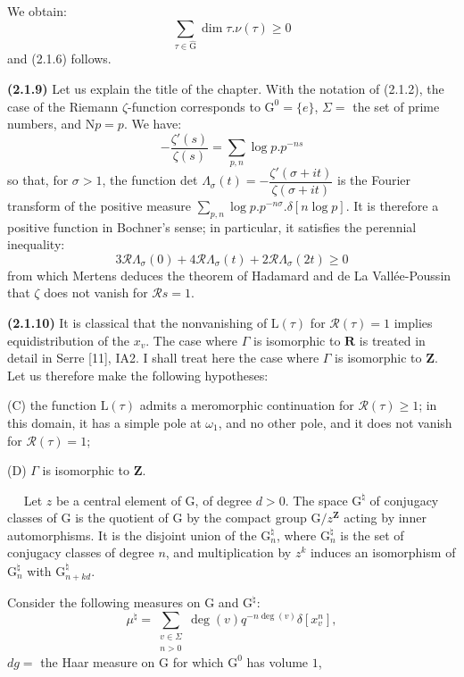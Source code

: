 \documentclass[11pt,leqno]{article}
\newcommand{\Page}[1]{\ifvmode\noindent\else\unskip\ \fi{\footnotesize\textcolor{gray}{[p.\,#1]}}\ \ignorespaces}
\begin{document}
We obtain:
\[
\sum_{\tau\in\widehat{\mathrm{G}}}\dim\tau.\nu(\tau)\geq0
\]
and (2.1.6) follows.

\textbf{(2.1.9)} Let us explain the title of the chapter. With the notation of (2.1.2), the case of the Riemann \(\zeta\)-function corresponds to \(\mathrm{G}^0=\{e\}\), \(\Sigma=\) the set of prime numbers, and \(\mathrm{N}p=p\). We have:
\[
-\frac{\zeta'(s)}{\zeta(s)}
 =\sum_{p,n}\log p.p^{-ns}
\]
so that, for \(\sigma>1\), the function det \(\Lambda_\sigma(t)=-\dfrac{\zeta'(\sigma+it)}{\zeta(\sigma+it)}\) is the Fourier transform of the positive measure \(\displaystyle\sum_{p,n}\log p.p^{-n\sigma}.\delta[n\log p]\). It is therefore a positive function in Bochner's sense; in particular, it satisfies the perennial inequality:
\[
3\mathscr{R}\Lambda_\sigma(0)
 +4\mathscr{R}\Lambda_\sigma(t)
 +2\mathscr{R}\Lambda_\sigma(2t)\geq0
\]
from which Mertens deduces the theorem of Hadamard and de La Vallée-Poussin that \(\zeta\) does not vanish for \(\mathscr{R}s=1\).

\textbf{(2.1.10)} It is classical that the nonvanishing of \(\mathrm{L}(\tau)\) for \(\mathscr{R}(\tau)=1\) implies equidistribution of the \(x_v\). The case where \(\Gamma\) is isomorphic to \(\mathbf{R}\) is treated in detail in Serre [11], IA2. I shall treat here the case where \(\Gamma\) is isomorphic to \(\mathbf{Z}\). Let us therefore make the following hypotheses:

\noindent (C) the function \(\mathrm{L}(\tau)\) admits a meromorphic continuation for \(\mathscr{R}(\tau)\geq1\); in this domain, it has a simple pole at \(\omega_1\), and no other pole, and it does not vanish for \(\mathscr{R}(\tau)=1\);

\noindent (D) \(\Gamma\) is isomorphic to \(\mathbf{Z}\).

\Page{192}
Let \(z\) be a central element of \(\mathrm{G}\), of degree \(d>0\). The space \(\mathrm{G}^{\natural}\) of conjugacy classes of \(\mathrm{G}\) is the quotient of \(\mathrm{G}\) by the compact group \(\mathrm{G}/z^{\mathbf{Z}}\) acting by inner automorphisms. It is the disjoint union of the \(\mathrm{G}_n^{\natural}\), where \(\mathrm{G}_n^{\natural}\) is the set of conjugacy classes of degree \(n\), and multiplication by \(z^k\) induces an isomorphism of \(\mathrm{G}_n^{\natural}\) with \(\mathrm{G}_{n+kd}^{\natural}\).

Consider the following measures on \(\mathrm{G}\) and \(\mathrm{G}^{\natural}\):
\[
\mu^{\natural}
 =\sum_{\substack{v\in\Sigma\\ n>0}}
   \deg(v)q^{-n\deg(v)}\delta[x_v^n],
\]
\noindent \(dg=\) the Haar measure on \(\mathrm{G}\) for which \(\mathrm{G}^0\) has volume \(1\),
\end{document}
